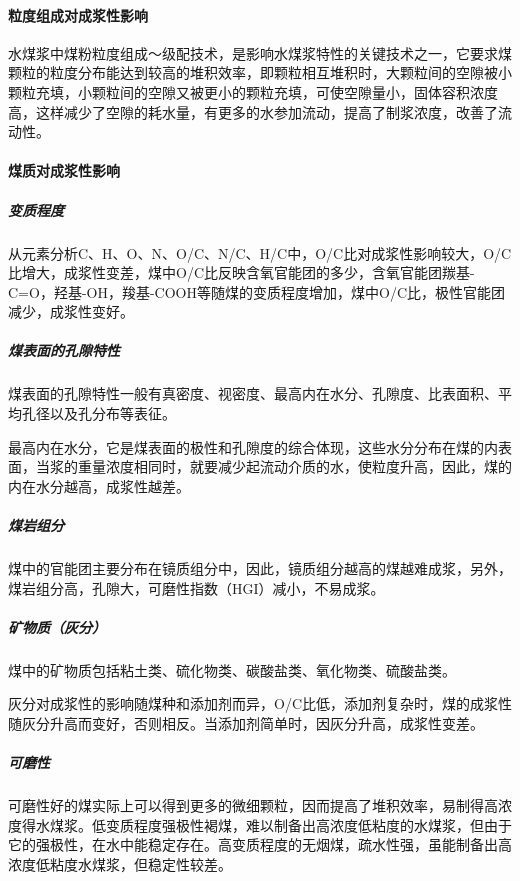 \documentclass[10pt,openany]{ctexbook}
\begin{document}
\paragraph{粒度组成对成浆性影响}
水煤浆中煤粉粒度组成～级配技术，是影响水煤浆特性的关键技术之一，它要求煤颗粒的粒度分布能达到较高的堆积效率，即颗粒相互堆积时，大颗粒间的空隙被小颗粒充填，小颗粒间的空隙又被更小的颗粒充填，可使空隙量小，固体容积浓度高，这样减少了空隙的耗水量，有更多的水参加流动，提高了制浆浓度，改善了流动性。
\paragraph{煤质对成浆性影响}
\subparagraph{变质程度} 从元素分析C、H、O、N、O/C、N/C、H/C中，O/C比对成浆性影响较大，O/C比增大，成浆性变差，煤中O/C比反映含氧官能团的多少，含氧官能团羰基-C=O，羟基-OH，羧基-COOH等随煤的变质程度增加，煤中O/C比，极性官能团减少，成浆性变好。
\subparagraph{煤表面的孔隙特性}
    煤表面的孔隙特性一般有真密度、视密度、最高内在水分、孔隙度、比表面积、平均孔径以及孔分布等表征。\par
               最高内在水分，它是煤表面的极性和孔隙度的综合体现，这些水分分布在煤的内表面，当浆的重量浓度相同时，就要减少起流动介质的水，使粒度升高，因此，煤的内在水分越高，成浆性越差。
  \subparagraph{煤岩组分}
煤中的官能团主要分布在镜质组分中，因此，镜质组分越高的煤越难成浆，另外，煤岩组分高，孔隙大，可磨性指数（HGI）减小，不易成浆。
\subparagraph{矿物质（灰分）} 煤中的矿物质包括粘土类、硫化物类、碳酸盐类、氧化物类、硫酸盐类。\par
    灰分对成浆性的影响随煤种和添加剂而异，O/C比低，添加剂复杂时，煤的成浆性随灰分升高而变好，否则相反。当添加剂简单时，因灰分升高，成浆性变差。
    \subparagraph{可磨性} 可磨性好的煤实际上可以得到更多的微细颗粒，因而提高了堆积效率，易制得高浓度得水煤浆。低变质程度强极性褐煤，难以制备出高浓度低粘度的水煤浆，但由于它的强极性，在水中能稳定存在。高变质程度的无烟煤，疏水性强，虽能制备出高浓度低粘度水煤浆，但稳定性较差。
\end{document}
